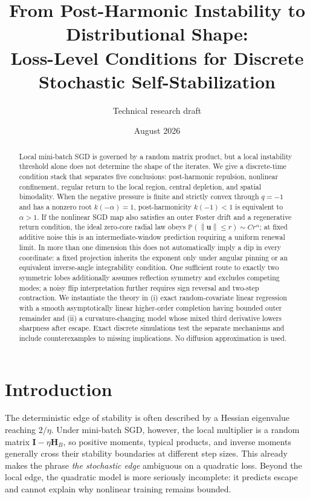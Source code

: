 \documentclass[10pt]{article}
\title{From Post-Harmonic Instability to Distributional Shape:\\
Loss-Level Conditions for Discrete Stochastic Self-Stabilization}
\author{Technical research draft}
\date{August 2026}
\theoremstyle{definition}
\theoremstyle{remark}
\newcommand{\Pp}{\mathbb P}
\newcommand{\norm}[1]{\left\lVert#1\right\rVert}
\newcommand{\Id}{\mathbf I}
\newcommand{\uvec}{\mathbf u}
\newcommand{\Hvec}{\mathbf H}
\begin{document}
\maketitle

\begin{abstract}
Local mini-batch SGD is governed by a random matrix product, but a local
instability threshold alone does not determine the shape of the iterates.
We give a discrete-time condition stack that separates five conclusions:
post-harmonic repulsion, nonlinear confinement, regular return to the local
region, central depletion, and spatial bimodality.  When the negative
pressure is finite and strictly convex through $q=-1$ and has a nonzero root
$k(-\alpha)=1$, post-harmonicity $k(-1)<1$ is equivalent to $\alpha>1$.
If the nonlinear SGD map also satisfies an outer Foster drift
and a regenerative return condition, the ideal zero-core radial law obeys
$\Pp(\norm{\uvec}\le r)\sim Cr^\alpha$; at fixed additive noise this is an
intermediate-window prediction requiring a uniform renewal limit.  In more than one dimension this
does not automatically imply a dip in every coordinate: a fixed projection
inherits the exponent only under angular pinning or an equivalent
inverse-angle integrability condition.  One sufficient route to exactly two
symmetric lobes additionally assumes reflection symmetry and excludes
competing modes; a noisy flip interpretation further requires sign reversal
and two-step contraction.  We instantiate
the theory in (i) exact random-covariate linear regression with a smooth
asymptotically linear higher-order completion having bounded outer remainder
and (ii) a curvature-changing model whose mixed third
derivative lowers sharpness after escape.  Exact discrete simulations test
the separate mechanisms and include counterexamples to missing implications.
No diffusion approximation is used.
\end{abstract}

\section{Introduction}

The deterministic edge of stability is often described by a Hessian
eigenvalue reaching $2/\eta$.  Under mini-batch SGD, however, the local
multiplier is a random matrix $\Id-\eta\Hvec_B$, so positive moments,
typical products, and inverse moments generally cross their stability
boundaries at different step sizes.  This already makes the phrase
\emph{the stochastic edge} ambiguous on a quadratic loss.  Beyond the local
edge, the quadratic model is more seriously incomplete: it predicts escape
and cannot explain why nonlinear training remains bounded.
\end{document}
